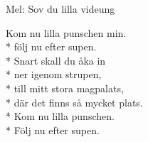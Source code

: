 \begin{SongText}
    \begin{SongInfo}
        Mel: Sov du lilla videung
    \end{SongInfo}
    \begin{SongVerse}
        Kom nu lilla punschen min.\\*%
        följ nu efter supen.\\*%
        Snart skall du åka in\\*%
        ner igenom strupen,\\*%
        till mitt stora magpalats,\\*%
        där det finns så mycket plats.\\*%
        Kom nu lilla punschen.\\*%
        Följ nu efter supen.
    \end{SongVerse}
\end{SongText}
